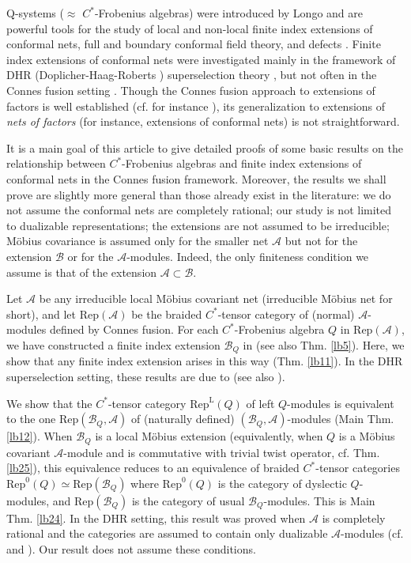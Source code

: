 \documentclass[11pt,b5paper,notitlepage]{article}
\theoremstyle{definition}
\theoremstyle{plain}
\newcommand{\mc}{\mathcal}
\newcommand{\Rep}{\mathrm{Rep}}
\newcommand{\RepA}{\mathrm{Rep}(\mathcal A)}
\newcommand{\RepL}{\mathrm{Rep}^{\mathrm{L}}}
\numberwithin{equation}{section}
\begin{document}
Q-systems ($\approx$ $C^*$-Frobenius algebras) were introduced by Longo \cite{Lon94} and are powerful tools for the study of local and non-local finite index extensions of conformal nets, full and boundary conformal field theory, and defects \cite{LR95,KL04,KLPR07,LR04,LR09,CKL13,BKL15,BKLR15,BKLR16,BDH19}. Finite index extensions of conformal nets were investigated mainly  in the framework of DHR (Doplicher-Haag-Roberts \cite{DHR71,DHR74}) superselection theory \cite{FRS89,FRS92},  but not often in the Connes fusion setting \cite{Con80,Sau83,Was98,BDH17}. Though the Connes fusion approach  to extensions of factors is well established (cf. for instance \cite{Mas97,Yuan19,GY20,CHPJP21}), its generalization to extensions of \textit{nets of factors} (for instance, extensions of conformal nets) is not straightforward.   

It is a main goal of this article to give detailed proofs  of some basic results on the relationship between $C^*$-Frobenius algebras and finite index extensions of conformal nets in the Connes fusion framework.   Moreover, the results we shall prove are slightly more general than those already exist in the literature: we do not assume the conformal nets are completely rational; our study is not limited to dualizable representations; the extensions are not assumed to be irreducible; M\"obius covariance is assumed only for the smaller net $\mc A$ but not for the extension $\mc B$ or for the $\mc A$-modules. Indeed, the only finiteness condition we assume is that of the extension $\mc A\subset\mc B$.


Let $\mc A$ be any irreducible local M\"obius covariant net (irreducible M\"obius net for short), and let $\RepA$ be the braided $C^*$-tensor category of (normal) $\mc A$-modules defined by Connes fusion. For each $C^*$-Frobenius algebra $Q$ in $\RepA$, we have constructed a finite index extension $\mc B_Q$ in \cite{Gui21b} (see also Thm. \ref{lb5}). Here, we show that any finite index extension arises in this way	(Thm. \ref{lb11}).  In the DHR superselection setting, these results are due to  \cite[Thm. 4.9]{LR95} (see also \cite[Sec. 5.2]{BKLR15}).

We show that the $C^*$-tensor category $\RepL(Q)$ of left $Q$-modules is equivalent to the one $\Rep(\mc B_Q,\mc A)$ of (naturally defined) $(\mc B_Q,\mc A)$-modules (Main Thm. \ref{lb12}). When $\mc B_Q$ is a local M\"obius extension (equivalently, when $Q$ is a M\"obius covariant $\mc A$-module and is commutative with trivial twist operator, cf. Thm. \ref{lb25}), this equivalence reduces to an equivalence of braided $C^*$-tensor categories $\Rep^0(Q)\simeq\Rep(\mc B_Q)$ where $\Rep^0(Q)$ is the category of dyslectic $Q$-modules, and $\Rep(\mc B_Q)$ is the category of usual $\mc B_Q$-modules. This is Main Thm. \ref{lb24}. In the DHR setting, this result was proved when $\mc A$ is completely rational and the categories are assumed to contain only dualizable $\mc A$-modules (cf. \cite{Mug10} and \cite[Prop. 6.4]{BKL15}). Our result does not assume these conditions.
	
\end{document}
